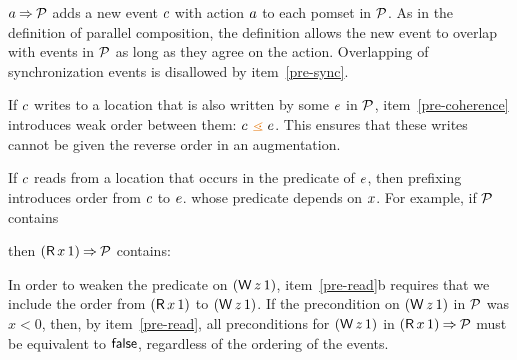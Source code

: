 $a\mathbin\Rightarrow\mathcal{P}$ adds a new event $c$ with action $a$ to each
pomset in $\mathcal{P}$.  As in the definition of parallel composition, the
definition allows the new event to overlap with events in $\mathcal{P}$ as long as
they agree on the action.  Overlapping of synchronization events is
disallowed by item~\ref{pre-sync}.

If $c$ writes to a location that is also written by some $e$ in $\mathcal{P}$,
item~\ref{pre-coherence} introduces weak order between them: $\cEv \gtN \aEv$.  This
ensures that these writes cannot be given the reverse order in an augmentation.

If $c$ reads from a location that occurs in the predicate of $e$, then
prefixing introduces order from $c$ to $e$.
whose predicate depends on $x$. 
For example, if $\mathcal{P}$ contains %
\begin{tikzinline}[node distance=1em]
\end{tikzinline}
then $(\DR{x}{1})\prefix\aPSS$ contains:
\begin{displaymathsmall}
\begin{tikzcenter}[node distance=1em]
\end{tikzcenter}
\qquad{}\qquad
\begin{tikzcenter}[node distance=1em]
\end{tikzcenter}
\end{displaymathsmall}
In order to weaken the predicate on $(\DW{z}{1})$, item~\ref{pre-read}b
requires that we include the order from $(\DR{x}{1})$ to $(\DW{z}{1})$.
If the precondition on $(\DW{z}{1})$ in $\mathcal{P}$ was $x<0$, then, by
item~\ref{pre-read}, all preconditions for $(\DW{z}{1})$ in
$(\DR{x}{1})\prefix\aPSS$ must be equivalent to $\mathsf{false}$, regardless of
the ordering of the events.


